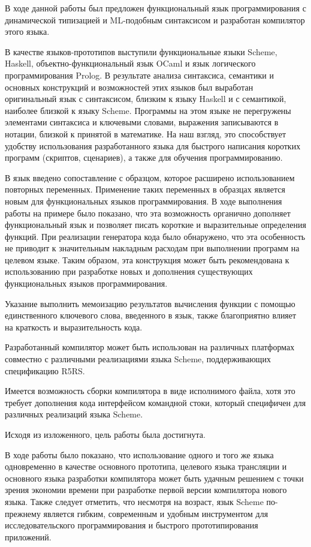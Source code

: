 \conclusiontitle
    В ходе данной работы был предложен функциональный язык
    программирования с динамической типизацией и ML-подобным синтаксисом
    и разработан компилятор этого языка.

    В качестве языков-прототипов выступили функциональные языки Scheme, Haskell, объектно-функциональный язык OCaml и язык логического программирования Prolog. 
    В результате анализа синтаксиса, семантики и основных конструкций и возможностей этих языков был выработан оригинальный язык с синтаксисом, близким к языку Haskell и с семантикой, наиболее близкой к языку Scheme. 
    Программы на этом языке не перегружены элементами синтаксиса и ключевыми словами, выражения записываются в нотации, близкой к принятой в математике. 
    На наш взгляд, это способствует удобству использования разработанного языка для быстрого написания коротких программ (скриптов, сценариев), а также для обучения программированию.

    В язык введено сопоставление с образцом, которое расширено использованием повторных переменных.
    Применение таких переменных в образцах является новым для функциональных языков программирования.
    В ходе выполнения работы на примере было показано, что эта возможность органично дополняет функциональный язык и позволяет писать короткие и выразительные определения функций.
    При реализации генератора кода было обнаружено, что эта особенность не приводит к значительным накладным расходам при выполнении программ на целевом языке.
    Таким образом, эта конструкция может быть рекомендована к использованию при разработке новых и дополнения существующих функциональных языков программирования.

    Указание выполнить мемоизацию результатов вычисления функции с помощью единственного ключевого слова, введенного в язык, также благоприятно влияет на краткость и выразительность кода.

    Разработанный компилятор может быть использован на различных платформах совместно с различными реализациями языка Scheme, поддерживающих спецификацию R5RS. 

    Имеется возможность сборки компилятора в виде исполнимого файла, хотя это требует дополнения кода интерфейсом командной стоки, который специфичен для различных реализаций языка Scheme.

    Исходя из изложенного, цель работы была достигнута.

    В ходе работы было показано, что использование одного и того же языка одновременно в качестве основного прототипа, целевого языка трансляции и основного языка разработки компилятора может быть удачным решением с точки зрения экономии времени при разработке первой версии компилятора нового языка.
    Также следует отметить, что несмотря на возраст, язык Scheme по-прежнему является гибким, современным и удобным инструментом для исследовательского программирования и быстрого прототипирования приложений.
       